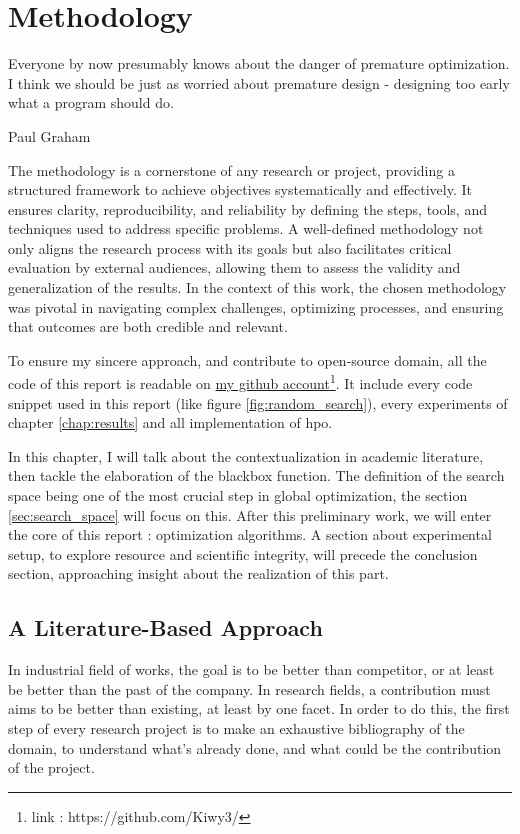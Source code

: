 \chapter{Methodology}
\label{chap:methodo}
\epigraph{Everyone by now presumably knows about the danger of premature optimization. I think we should be just as worried about premature design - designing too early what a program should do.}{Paul Graham}

The methodology is a cornerstone of any research or project, providing a structured framework to achieve objectives systematically and effectively. It ensures clarity, reproducibility, and reliability by defining the steps, tools, and techniques used to address specific problems. A well-defined methodology not only aligns the research process with its goals but also facilitates critical evaluation by external audiences, allowing them to assess the validity and generalization of the results. In the context of this work, the chosen methodology was pivotal in navigating complex challenges, optimizing processes, and ensuring that outcomes are both credible and relevant.

To ensure my sincere approach, and contribute to open-source domain, all the code of this report is readable on  \href{https://github.com/Kiwy3/}{my github account}\footnote{link : https://github.com/Kiwy3/}. It include every code snippet used in this report (like figure \ref{fig:random_search}), every experiments of chapter \ref{chap:results} and all implementation of \acrshort{hpo}.

In this chapter, I will talk about the contextualization in academic literature, then tackle the elaboration of the blackbox function. The definition of the search space being one of the most crucial step in global optimization, the section \ref{sec:search_space} will focus on this. After this preliminary work, we will enter the core of this report : optimization algorithms. A section about experimental setup, to explore resource and scientific integrity, will precede the conclusion section, approaching insight about the realization of this part.


\section{A Literature-Based Approach}
\label{sec:litterature}
In industrial field of works, the goal is to be better than competitor, or at least be better than the past of the company. In research fields, a contribution must aims to be better than existing, at least by one facet. In order to do this, the first step of every research project is to make an exhaustive bibliography of the domain, to understand what's already done, and what could be the contribution of the project. 

